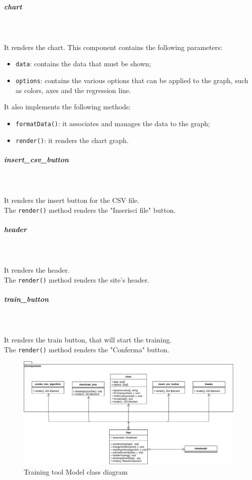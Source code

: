 \subparagraph*{chart}\mbox{} \\ \mbox{} \\
It renders the chart.
This component contains the following parameters: 
\begin{itemize}
\item \texttt{data}: contains the data that must be shown;
\item \texttt{options}: contains the various options that can be applied to the graph, such as colors, axes and the regression line.
\end{itemize}
It also implements the following methods: 
\begin{itemize}
\item \texttt{formatData()}: it associates and manages the data to the graph;
\item \texttt{render()}: it renders the chart graph.

\end{itemize}

\subparagraph*{insert\_csv\_button}\mbox{} \\ \mbox{} \\
It renders the insert button for the CSV file.\\
The \texttt{render()} method renders the "Inserisci file" button.

\subparagraph*{header}\mbox{} \\ \mbox{} \\
It renders the header.\\
The \texttt{render()} method renders the site's header.

\subparagraph*{train\_button}\mbox{} \\ \mbox{} \\
It renders the train button, that will start the training.\\
The \texttt{render()} method renders the "Conferma" button.

\begin{figure}[H]
\centering
\includegraphics[scale=0.45]{../../../Diagrams/Classes_diagrams/tool_view.png}
\caption{Training tool Model class diagram}
\end{figure}

